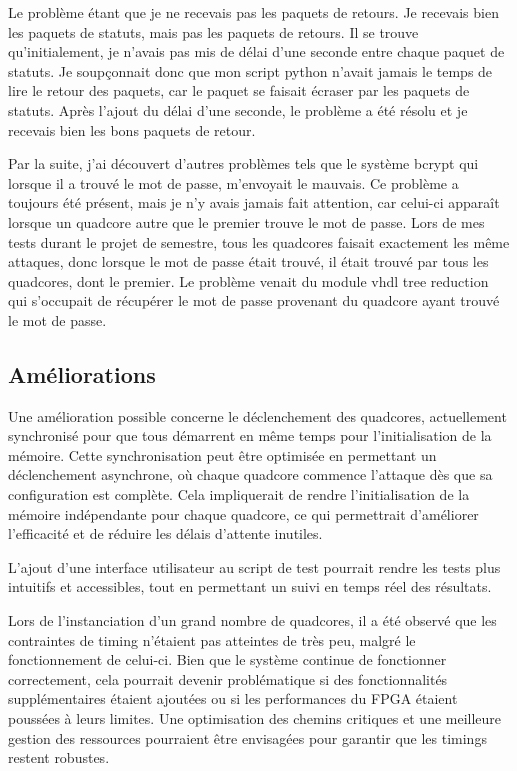 Le problème étant que je ne recevais pas les paquets de retours.
Je recevais bien les paquets de statuts, mais pas les paquets de retours.
Il se trouve qu'initialement, je n'avais pas mis de délai d'une seconde entre chaque paquet de statuts.
Je soupçonnait donc que mon script python n'avait jamais le temps de lire le retour des paquets, car le paquet se faisait écraser par les paquets de statuts.
Après l'ajout du délai d'une seconde, le problème a été résolu et je recevais bien les bons paquets de retour.

Par la suite, j'ai découvert d'autres problèmes tels que le système bcrypt qui lorsque il a trouvé le mot de passe, m'envoyait le mauvais.
Ce problème a toujours été présent, mais je n'y avais jamais fait attention, car celui-ci apparaît lorsque un quadcore autre que le premier trouve le mot de passe.
Lors de mes tests durant le projet de semestre, tous les quadcores faisait exactement les même attaques, donc lorsque le mot de passe était trouvé, il était trouvé par tous les quadcores, dont le premier.
Le problème venait du module \gls{vhdl} tree reduction qui s'occupait de récupérer le mot de passe provenant du quadcore ayant trouvé le mot de passe.

\subsection{Améliorations}

Une amélioration possible concerne le déclenchement des quadcores, actuellement synchronisé pour que tous démarrent en même temps pour l'initialisation de la mémoire. 
Cette synchronisation peut être optimisée en permettant un déclenchement asynchrone, où chaque quadcore commence l'attaque dès que sa configuration est complète. 
Cela impliquerait de rendre l'initialisation de la mémoire indépendante pour chaque quadcore, ce qui permettrait d'améliorer l'efficacité et de réduire les délais d'attente inutiles. 

L'ajout d'une interface utilisateur au script de test pourrait rendre les tests plus intuitifs et accessibles, tout en permettant un suivi en temps réel des résultats.

Lors de l'instanciation d'un grand nombre de quadcores, il a été observé que les contraintes de timing n'étaient pas atteintes de très peu, malgré le fonctionnement de celui-ci. 
Bien que le système continue de fonctionner correctement, cela pourrait devenir problématique si des fonctionnalités supplémentaires étaient ajoutées ou si les performances du FPGA étaient poussées à leurs limites. 
Une optimisation des chemins critiques et une meilleure gestion des ressources pourraient être envisagées pour garantir que les timings restent robustes.

